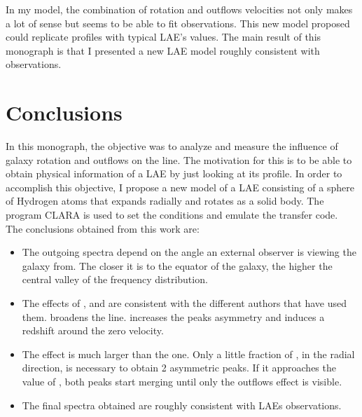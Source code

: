 \documentclass[twocolappendix]{latex/emulateapj}
\begin{document}
In my model, the combination of rotation and outflows velocities not only makes a lot of sense but seems to be able to fit observations. This new model proposed could replicate \lya profiles with typical LAE's values. The main result of this monograph is that I presented a new LAE model roughly consistent with observations.\\


\section{Conclusions}
\label{sec:conclusions}

In this monograph, the objective was to analyze and measure the influence of galaxy rotation and outflows on the \lya line. The motivation for this is to be able to obtain physical information of a LAE by just looking at its \lya profile. In order to accomplish this objective, I propose a new model of a LAE consisting of a sphere of Hydrogen atoms that expands radially and rotates as a solid body. The program CLARA \cite{CLARA} is used to set the conditions and emulate the transfer code. \\

The conclusions obtained from this work are: \\

\begin{itemize}
	\item The outgoing spectra depend on the angle an external observer is viewing the galaxy from. The closer it is to the equator of the galaxy, the higher the central valley of the frequency distribution. \\
	
	\item The effects of \vrot, \vout and \tauh are consistent with the different authors that have used them. \vrot broadens the \lya line. \vout increases the peaks asymmetry and \tauh induces a redshift around the zero velocity.\\
	
	\item The \vrot effect is much larger than the \vout one. Only a little fraction of \vrot, in the radial direction, is necessary to obtain 2 asymmetric peaks. If it \vout approaches the value of \vrot, both peaks start merging until only the outflows effect is visible. \\
	
	\item The final spectra obtained are roughly consistent with LAEs observations.  \\
	
\end{itemize}
\end{document}
